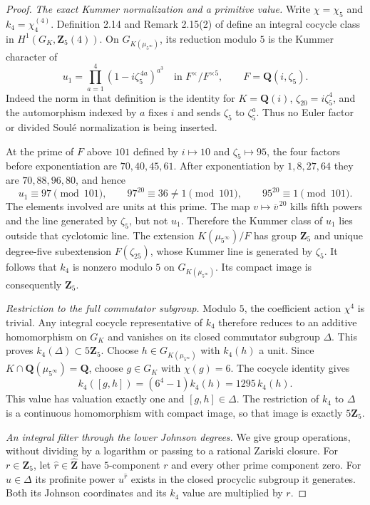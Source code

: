 \begin{proof}
\emph{The exact Kummer normalization and a primitive value.}
Write $\chi=\chi_5$ and $k_4=\chi^{(4)}_4$.
Definition 2.14 and Remark 2.15(2) of
\citet{fghIshiiGoto} define an integral cocycle class
in $H^1(G_K,\mathbf Z_5(4))$. On
$G_{K(\mu_{5^\infty})}$, its reduction modulo $5$ is the
Kummer character of
\[
 u_1=\prod_{a=1}^4(1-i\zeta_5^{\,4a})^{a^3}
       \quad\text{in }F^\times/F^{\times5},
 \qquad F=\mathbf Q(i,\zeta_5).
\]
Indeed the norm in that definition is the identity for $K=\mathbf
Q(i)$, $\zeta_{20}=i\zeta_5^4$, and the automorphism indexed by
$a$ fixes $i$ and sends $\zeta_5$ to $\zeta_5^a$. Thus no
Euler factor or divided Soul\'e normalization is being inserted.

At the prime of $F$ above $101$ defined by $i\mapsto10$ and
$\zeta_5\mapsto95$, the four factors before exponentiation are
$70,40,45,61$. After exponentiation by $1,8,27,64$ they are
$70,88,96,80$, and hence
\[
 u_1\equiv97\pmod{101},\qquad
 97^{20}\equiv36\ne1\pmod{101},\qquad95^{20}\equiv1\pmod{101}.
\]
The elements involved are units at this prime. The map
$v\mapsto\overline v^{\,20}$ kills fifth powers and the line
generated by $\zeta_5$, but not $u_1$. Therefore the Kummer
class of $u_1$ lies outside that cyclotomic line.
The extension $K(\mu_{5^\infty})/F$ has group $\mathbf Z_5$
and unique degree-five subextension $F(\zeta_{25})$,
whose Kummer line is generated by $\zeta_5$.
It follows that $k_4$ is nonzero modulo $5$ on
$G_{K(\mu_{5^\infty})}$. Its compact image is consequently
$\mathbf Z_5$.

\emph{Restriction to the full commutator subgroup.}
Modulo $5$, the coefficient action $\chi^4$ is trivial. Any
integral cocycle representative of $k_4$ therefore reduces
to an additive homomorphism on $G_K$ and vanishes on
its closed commutator subgroup $\Delta$. This proves
$k_4(\Delta)\subset5\mathbf Z_5$.
Choose $h\in G_{K(\mu_{5^\infty})}$ with $k_4(h)$ a unit.
Since $K\cap\mathbf Q(\mu_{5^\infty})=\mathbf Q$, choose
$g\in G_K$ with $\chi(g)=6$. The cocycle identity gives
\[
 k_4([g,h])=(6^4-1)k_4(h)=1295\,k_4(h).
\]
This value has valuation exactly one and $[g,h]\in\Delta$.
The restriction of $k_4$ to $\Delta$ is a continuous
homomorphism with compact image, so that image is
exactly $5\mathbf Z_5$.

\emph{An integral filter through the lower Johnson degrees.}
We give group operations, without dividing by a logarithm
or passing to a rational Zariski closure.
For $r\in\mathbf Z_5$, let $\widehat r\in\widehat{\mathbf Z}$
have $5$-component $r$ and every other prime component zero.
For $u\in\Delta$ its profinite power $u^{\widehat r}$
exists in the closed procyclic subgroup it generates.
Both its Johnson coordinates and its $k_4$ value are
multiplied by $r$.


\end{proof}
